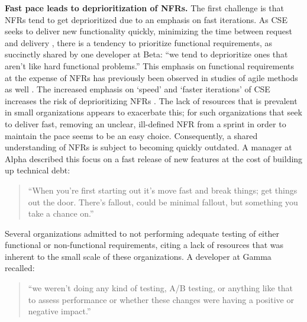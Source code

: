 \documentclass[smallextended]{svjour3}
\begin{document}
\textbf{Fast pace leads to deprioritization of NFRs.} The first challenge is that NFRs tend to get deprioritized due to an emphasis on fast iterations. As CSE seeks to deliver new functionality quickly, minimizing the time between request and delivery \citep{fitzgerald2017continuous}, there is a tendency to prioritize functional requirements, as succinctly shared by one developer at Beta: \textmd{``we tend to deprioritize ones that aren't like hard functional problems.''}
This emphasis on functional requirements at the expense of NFRs has previously been observed in studies of agile methods as well \citep{ramesh_agile_2010}. The increased emphasis on `speed' and `faster iterations' of CSE increases the risk of deprioritizing NFRs \citep{savor_continuous_2016, gralha_evolution_2018}.
The lack of resources that is prevalent in small organizations appears to exacerbate this; for such organizations that seek to deliver fast, removing an unclear, ill-defined NFR from a sprint in order to maintain the pace seems to be an easy choice. 
Consequently, a shared understanding of NFRs is subject to becoming quickly outdated. A manager at Alpha described this focus on a fast release of new features at the cost of building up technical debt:
\begin{quote}  
``When you're first starting out it's move fast and break things; get things
out the door. There's fallout, could be minimal fallout, but something
you take a chance on.''
\end{quote}   
Several organizations admitted to not performing adequate testing of either functional or non-functional requirements, citing a lack of resources that was inherent to the small scale of these organizations. 
A developer at Gamma recalled:
\begin{quote}
    ``we weren't doing any kind of testing, A/B testing, or anything like that to assess performance or whether these changes were having a positive or negative impact.''
\end{quote}
\end{document}
